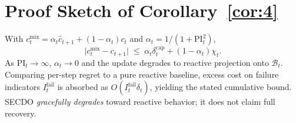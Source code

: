 \section{Proof Sketch of Corollary~\ref{cor:4}}
\label{app:cor4}

With $c^{\mathrm{mix}}_t=\alpha_t\hat c_{t+1}+(1-\alpha_t)c_t$ and $\alpha_t=1/(1+\mathrm{PI}_t^2)$,
\begin{equation}
\lvert c^{\mathrm{mix}}_t-c_{t+1}\rvert
\;\le\;
\alpha_t\delta_t^{\mathrm{cap}}+(1-\alpha_t)\chi_t.
\end{equation}
As $\mathrm{PI}_t\to\infty$, $\alpha_t\to 0$ and the update degrades to reactive projection onto $\mathcal{B}_t$.
Comparing per-step regret to a pure reactive baseline, excess cost on failure indicators $I_t^{\mathrm{fail}}$ is absorbed as $O(I_t^{\mathrm{fail}}\delta_t)$, yielding the stated cumulative bound.
SECDO \emph{gracefully degrades} toward reactive behavior; it does not claim full recovery.

